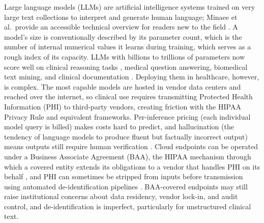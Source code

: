 \documentclass[11pt]{article}
\begin{document}
Large language models (LLMs) are artificial intelligence systems trained on very large text collections to interpret and generate human language; Minaee et al.\ provide an accessible technical overview for readers new to the field \cite{Minaee2024}. A model's size is conventionally described by its parameter count, which is the number of internal numerical values it learns during training, which serves as a rough index of its capacity. LLMs with billions to trillions of parameters now score well on clinical reasoning tasks \cite{Singhal2023, Nori2023}, medical question answering, biomedical text mining, and clinical documentation \cite{Thirunavukarasu2023, VanVeen2024}. Deploying them in healthcare, however, is complex. The most capable models are hosted in vendor data centers and reached over the internet, so clinical use requires transmitting Protected Health Information (PHI) to third-party vendors, creating friction with the HIPAA Privacy Rule and equivalent frameworks. Per-inference pricing (each individual model query is billed) makes costs hard to predict, and hallucination (the tendency of language models to produce fluent but factually incorrect output) means outputs still require human verification \cite{Adams2026, Su2025}. Cloud endpoints can be operated under a Business Associate Agreement (BAA), the HIPAA mechanism through which a covered entity extends its obligations to a vendor that handles PHI on its behalf \cite{HHSBAA, Marks2023HIPAAAI}, and PHI can sometimes be stripped from inputs before transmission using automated de-identification pipelines \cite{Kovacevic2024DeID}. BAA-covered endpoints may still raise institutional concerns about data residency, vendor lock-in, and audit control, and de-identification is imperfect, particularly for unstructured clinical text.
\end{document}
